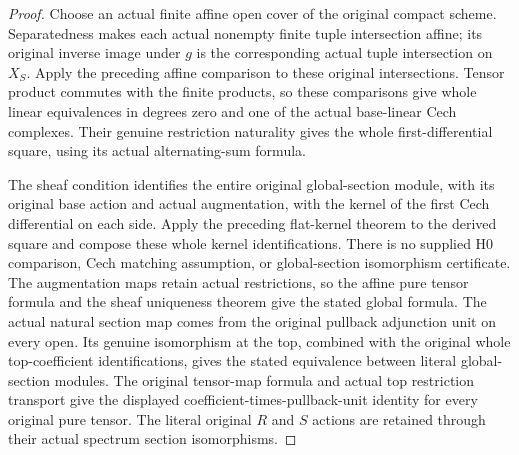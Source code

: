 \begin{proof}
Choose an actual finite affine open cover of the original compact
scheme. Separatedness makes each actual nonempty finite tuple
intersection affine; its original inverse image under $g$ is the
corresponding actual tuple intersection on $X_S$. Apply the preceding
affine comparison to these original intersections. Tensor product
commutes with the finite products, so these comparisons give whole
linear equivalences in degrees zero and one of the actual base-linear
Cech complexes. Their genuine restriction naturality gives the whole
first-differential square, using its actual alternating-sum formula.

The sheaf condition identifies the entire original global-section
module, with its original base action and actual augmentation, with the
kernel of the first Cech differential on each side. Apply the preceding
flat-kernel theorem to the derived square and compose these whole
kernel identifications. There is no supplied H0 comparison, Cech
matching assumption, or global-section isomorphism certificate.
The augmentation maps retain actual restrictions, so the affine pure
tensor formula and the sheaf uniqueness theorem give the stated global
formula. The actual natural section map comes from the original pullback
adjunction unit on every open. Its genuine isomorphism at the top,
combined with the original whole top-coefficient identifications,
gives the stated equivalence between literal global-section modules.
The original tensor-map formula and actual top restriction transport
give the displayed coefficient-times-pullback-unit identity for every
original pure tensor. The literal original $R$ and $S$ actions are
retained through their actual spectrum section isomorphisms.
\end{proof}
